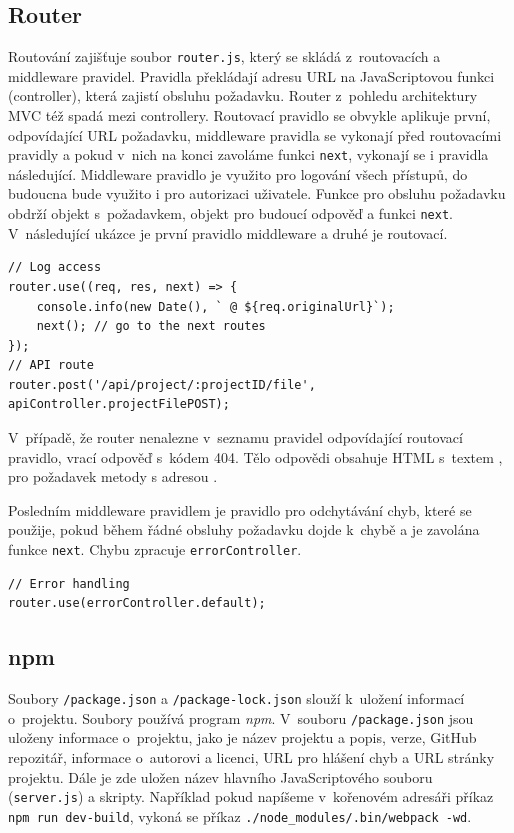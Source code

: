 \subsection{Router}
Routování zajišťuje soubor \texttt{router.js}, který se skládá z~routovacích a middleware pravidel. Pravidla překládají adresu URL na JavaScriptovou funkci (controller), která zajistí obsluhu požadavku. Router z~pohledu architektury MVC též spadá mezi controllery. Routovací pravidlo se obvykle aplikuje první, odpovídající URL požadavku, middleware pravidla se vykonají před routovacími pravidly a pokud v~nich na konci zavoláme funkci \texttt{next}, vykonají se i pravidla následující. Middleware pravidlo je využito pro logování všech přístupů, do budoucna bude využito i pro autorizaci uživatele. Funkce pro obsluhu požadavku obdrží objekt s~požadavkem, objekt pro budoucí odpověď a funkci \texttt{next}. V~následující ukázce je první pravidlo middleware a druhé je routovací.
\begin{lstlisting}[style=JavaScript]
// Log access
router.use((req, res, next) => {
    console.info(new Date(), ` @ ${req.originalUrl}`);
    next(); // go to the next routes
});
// API route
router.post('/api/project/:projectID/file', apiController.projectFilePOST);
\end{lstlisting}

V~případě, že router nenalezne v~seznamu pravidel odpovídající routovací pravidlo, vrací odpověď s~kódem 404. Tělo odpovědi obsahuje HTML s~textem , pro požadavek metody  s adresou .

Posledním middleware pravidlem je pravidlo pro odchytávání chyb, které se použije, pokud během řádné obsluhy požadavku dojde k~chybě a je zavolána funkce \texttt{next}. Chybu zpracuje \texttt{errorController}.
\begin{lstlisting}[style=JavaScript]
// Error handling
router.use(errorController.default);
\end{lstlisting}

\subsection{npm}
Soubory \texttt{/package.json} a \texttt{/package-lock.json} slouží k~uložení informací o~projektu. Soubory používá program \textit{npm}. V~souboru \texttt{/package.json} jsou uloženy informace o~projektu, jako je název projektu a popis, verze, GitHub repozitář, informace o~autorovi a licenci, URL pro hlášení chyb a URL stránky projektu. Dále je zde uložen název hlavního JavaScriptového souboru (\texttt{server.js}) a skripty. Například pokud napíšeme v~kořenovém adresáři příkaz \texttt{npm run dev-build}, vykoná se příkaz \texttt{./node\_modules/.bin/webpack -wd}.

